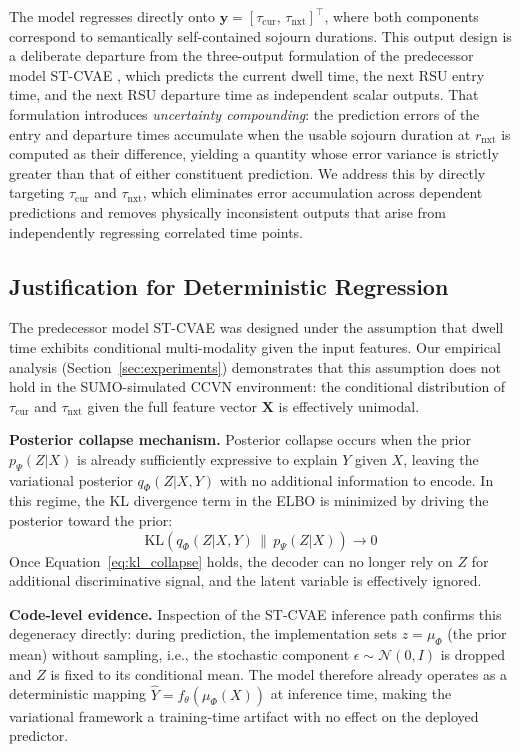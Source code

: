 \documentclass[journal]{IEEEtran}
\begin{document}
The model regresses directly onto $\mathbf{y} = [\tau_\text{cur},\, \tau_\text{nxt}]^\top$, where both components correspond to semantically self-contained sojourn durations.
This output design is a deliberate departure from the three-output formulation of the predecessor model ST-CVAE \cite{STCVAE}, which predicts the current dwell time, the next RSU entry time, and the next RSU departure time as independent scalar outputs.
That formulation introduces \textit{uncertainty compounding}: the prediction errors of the entry and departure times accumulate when the usable sojourn duration at $r_\text{nxt}$ is computed as their difference, yielding a quantity whose error variance is strictly greater than that of either constituent prediction.
We address this by directly targeting $\tau_\text{cur}$ and $\tau_\text{nxt}$, which eliminates error accumulation across dependent predictions and removes physically inconsistent outputs that arise from independently regressing correlated time points.

\subsection{Justification for Deterministic Regression}

The predecessor model ST-CVAE was designed under the assumption that dwell time exhibits conditional multi-modality given the input features.
Our empirical analysis (Section~\ref{sec:experiments}) demonstrates that this assumption does not hold in the SUMO-simulated CCVN environment: the conditional distribution of $\tau_\text{cur}$ and $\tau_\text{nxt}$ given the full feature vector $\mathbf{X}$ is effectively unimodal.

\textbf{Posterior collapse mechanism.}
Posterior collapse occurs when the prior $p_\Psi(Z|X)$ is already sufficiently expressive to explain $Y$ given $X$, leaving the variational posterior $q_\Phi(Z|X,Y)$ with no additional information to encode.
In this regime, the KL divergence term in the ELBO is minimized by driving the posterior toward the prior:
\begin{equation}
    \text{KL}(q_\Phi(Z|X,Y) \,\|\, p_\Psi(Z|X)) \to 0
    \label{eq:kl_collapse}
\end{equation}
Once Equation~\eqref{eq:kl_collapse} holds, the decoder can no longer rely on $Z$ for additional discriminative signal, and the latent variable is effectively ignored.

\textbf{Code-level evidence.}
Inspection of the ST-CVAE inference path confirms this degeneracy directly: during prediction, the implementation sets $z = \mu_\Phi$ (the prior mean) without sampling, i.e., the stochastic component $\epsilon \sim \mathcal{N}(0, I)$ is dropped and $Z$ is fixed to its conditional mean.
The model therefore already operates as a deterministic mapping $\hat{Y} = f_\theta(\mu_\Phi(X))$ at inference time, making the variational framework a training-time artifact with no effect on the deployed predictor.
\end{document}
